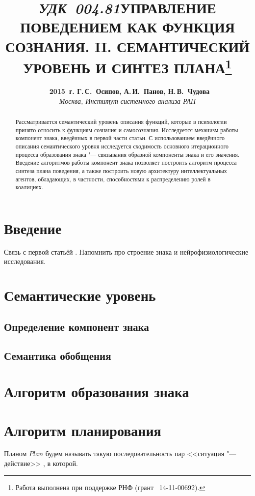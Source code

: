 \documentclass[a4paper, 12pt]{article}
\title{\hbox{\normalsize\textit{УДК 004.81}}\hbox{}\textbf{\Large\MakeUppercase{Управление поведением как функция сознания. II. Семантический уровень и синтез плана}}\footnote{Работа выполнена при поддержке РНФ (грант \No\ 14-11-00692).}}
\author{\textbf{\textcopyright~2015~г. Г.\,С.~Осипов, А.\,И.~Панов, Н.\,В.~Чудова}\\\normalsize\textit{Москва, Институт системного анализа РАН}}
\date{}
\theoremstyle{plain}
\begin{document}
	\vspace*{-5\baselineskip}			%
	{\let\newpage\relax\maketitle}
	
	\begin{abstract}
		\noindent Рассматривается семантический уровень описания функций, которые в психологии принято относить к функциям сознания и самосознания. Исследуется механизм работы компонент знака, введённых в первой части статьи. С использованием введённого описания семантического уровня исследуется сходимость основного итерационного процесса образования знака "--- связывания образной компоненты знака и его значения. Введение алгоритмов работы компонент знака позволяет построить алгоритм процесса синтеза плана поведения, а также построить новую архитектуру интеллектуальных агентов, обладающих, в частности, способностями к распределению ролей в коалициях.
	\end{abstract}	
	
	\section*{Введение}
	Связь с первой статьёй \cite{PanovA2014a}. Напомнить про строение знака и нейрофизиологические исследования.
	
	\section{Семантические уровень}
	\subsection{Определение компонент знака}
	\subsection{Семантика обобщения}
	\section{Алгоритм образования знака}
	
	\section{Алгоритм планирования}	Планом $Plan$ будем называть такую последовательность пар <<ситуация "--- действие>> , в которой.
	
\end{document}
